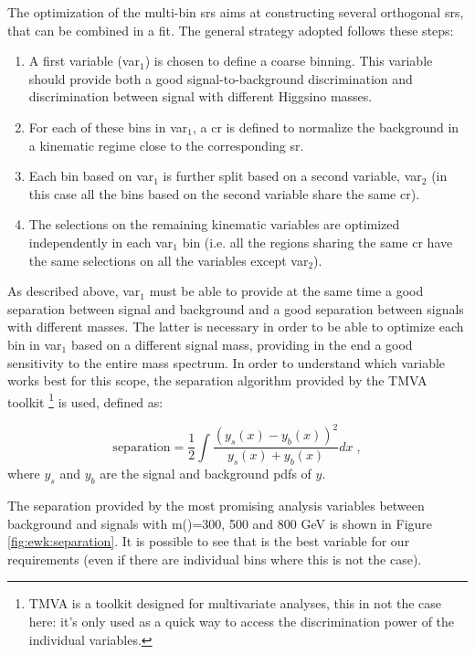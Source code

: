 The optimization of the multi-bin \glspl{sr} aims at constructing several orthogonal \glspl{sr}, that can be combined in a fit. 
The general strategy adopted follows these steps:
\begin{enumerate}
\item A first variable (var$_1$) is chosen to define a coarse binning. 
    This variable should provide both a good signal-to-background discrimination and discrimination between signal 
    with different Higgsino masses.
\item For each of these bins in var$_1$, a \gls{cr} is defined to normalize the \ttbar background in a kinematic regime close to the corresponding \gls{sr}.
\item Each bin based on var$_1$ is further split based on a second variable, var$_2$ (in this case all the bins based on the second variable share the same \gls{cr}).
\item The selections on the remaining kinematic variables are optimized independently in each var$_1$ bin (i.e. all the regions sharing the same 
\gls{cr} have the same selections on all the variables except var$_2$).
\end{enumerate}

\noindent As described above, var$_1$ must be able to provide at the same time a good separation between signal and background 
and a good separation between signals with different \hino masses. 
The latter is necessary in order to be able to optimize each bin in var$_1$ based on a different signal mass, 
providing in the end a good sensitivity to the entire mass spectrum. 
In order to understand which variable works best for this scope, the separation algorithm provided by the TMVA toolkit \footnote{TMVA is a toolkit designed for multivariate analyses, this in not the case here: it's only used as a quick way to access the discrimination power of the individual variables.} \cite{Hocker:2007ht} is used, defined as:

\begin{equation}
          \mathrm{separation} = \frac{1}{2} \int\frac{\left(y_s(x) - y_b(x)\right)^2}{y_s(x) + y_b(x)} dx \; , 
\label{eq:separation}
\end{equation}
\noindent where $y_s$ and $y_b$ are the signal and background \glspl{pdf} of $y$. 

The separation provided by the most promising analysis variables between background and 
signals with m(\hino)=300, 500 and 800 GeV is shown in Figure \ref{fig:ewk:separation}.
It is possible to see that \meffb is the best variable for our requirements (even if there are individual bins where this is not the case).

